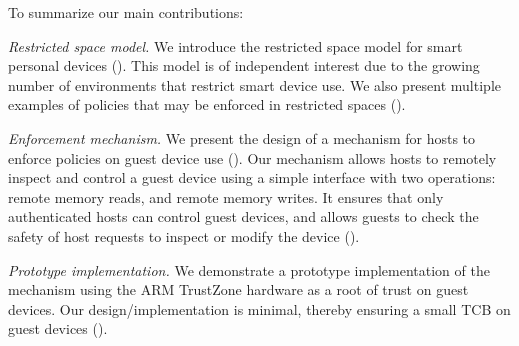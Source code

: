 To summarize our main contributions:
%
\begin{mybullet}
%
\item \textit{Restricted space model.} We introduce the restricted space model
for smart personal devices (). This model is of
independent interest due to the growing number of environments that restrict
smart device use. We also present multiple examples of policies that may be
enforced in restricted spaces ().
%
\item \textit{Enforcement mechanism.} We present the design of a mechanism for
hosts to enforce policies on guest device use ().
Our mechanism allows hosts to remotely inspect and control a guest device using
a simple interface with two operations: remote memory reads, and remote memory
writes. It ensures that only authenticated hosts can control guest devices, and
allows guests to check the safety of host requests to inspect or modify the
device (). 
%
\item \textit{Prototype implementation.} We demonstrate a prototype
implementation of the mechanism using the ARM TrustZone hardware as a root of
trust on guest devices. Our design/implementation is minimal, thereby ensuring
a small TCB on guest devices ().
%
\end{mybullet}
